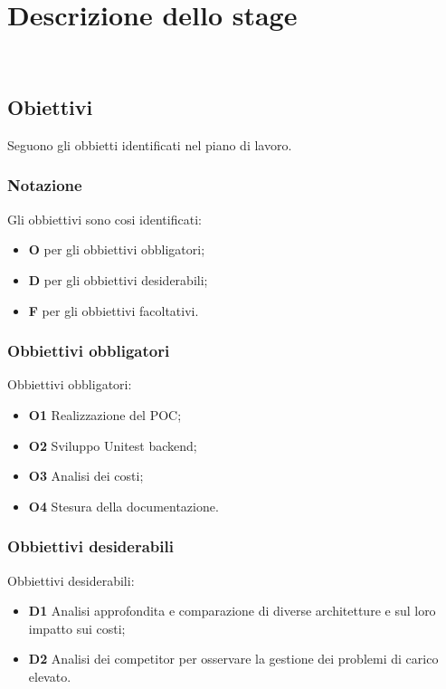 \chapter{Descrizione dello stage}
\\
\label{cap:descrizione-stage}
\section{Obiettivi}
\label{sec:obiettivi}
Seguono gli obbietti identificati nel piano di lavoro.
\subsection{Notazione}
\label{subsec:notazione}
Gli obbiettivi sono cosi identificati:
\begin{itemize}
    \item \textbf{O} per gli obbiettivi obbligatori;
    \item \textbf{D} per gli obbiettivi desiderabili;
    \item \textbf{F} per gli obbiettivi facoltativi.
\end{itemize}
\subsection{Obbiettivi obbligatori}
Obbiettivi obbligatori:
\begin{itemize}
    \item \textbf{O1} Realizzazione del POC;
    \item \textbf{O2} Sviluppo Unitest backend;
    \item \textbf{O3} Analisi dei costi;
    \item \textbf{O4} Stesura della documentazione.
\end{itemize}
\subsection{Obbiettivi desiderabili}
Obbiettivi desiderabili:
\begin{itemize}
    \item \textbf{D1} Analisi approfondita e comparazione di diverse architetture e sul loro impatto sui costi;
    \item \textbf{D2} Analisi dei competitor per osservare la gestione dei problemi di carico elevato.
\end{itemize}

